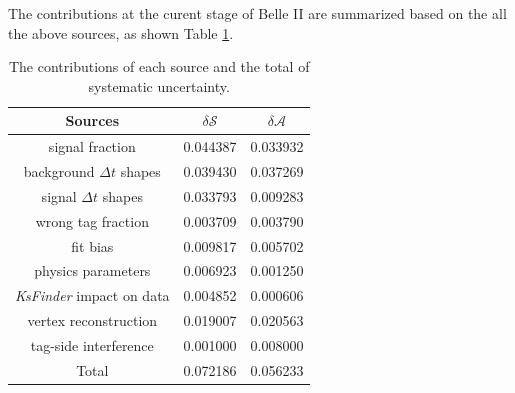 The contributions at the curent stage of Belle II are summarized based on the all the above sources, as shown Table \ref{tab:sy_sub}. 

\begin{table}
	\centering
		\caption{The contributions of each source and the total of systematic uncertainty.  }
	\label{tab:sy_sub}
	\begin{tabular}{c|c|c} 
		\hline
		Sources &  $\delta \mathcal{S}$ & $\delta \mathcal{A}$\\
		\hline
		signal fraction  & 0.044387 & 0.033932 \\
		background $\Delta t$ shapes & 0.039430 & 0.037269\\
		signal $\Delta t$ shapes & 0.033793 & 0.009283 \\
		wrong tag fraction & 0.003709 & 0.003790\\
		fit bias & 0.009817 & 0.005702 \\
		physics parameters & 0.006923 & 0.001250\\ 
		\textit{KsFinder} impact on data & 0.004852 & 0.000606\\
		vertex reconstruction & 0.019007 & 0.020563\\
		tag-side interference & 0.001000 & 0.008000\\
		\hline
		Total & 0.072186 & 0.056233\\
		\hline
	\end{tabular}

\end{table}
